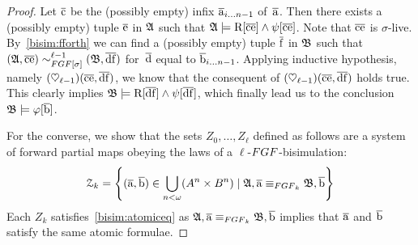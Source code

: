 \begin{proof}
  Let $\overline{\mathrm{c}}$ be the (possibly empty) infix $\overline{\mathrm{a}}_{i\ldots n{-}1}$ of~$\overline{\mathrm{a}}$.
  Then there exists a (possibly empty) tuple $\overline{\mathrm{e}}$ in ${\mathfrak{A}}$ such that ${\mathfrak{A}} \models \mathrm{R}[\overline{\mathrm{c}}\overline{\mathrm{e}}] \land \psi[\overline{\mathrm{c}}\overline{\mathrm{e}}]$.
  Note that $\overline{\mathrm{c}}\overline{\mathrm{e}}$ is $\sigma$-live. 
  By~\ref{bisim:fforth} we can find a (possibly empty) tuple $\overline{\mathrm{f}}$ in ${\mathfrak{B}}$ such that $(\str{A}, \elemtuplec\elemtuplee) \bisimto_{\FGF[\sigma]}^{\ell{-}1} (\str{B}, \elemtupled\elemtuplef)$ for~$\overline{\mathrm{d}}$ equal to $\overline{\mathrm{b}}_{i\ldots n{-}1}$.
  Applying inductive hypothesis, namely $(\heartsuit_{\ell{-}1})(\overline{\mathrm{c}}\overline{\mathrm{e}},\overline{\mathrm{d}}\overline{\mathrm{f}})$, we know that the consequent of $(\heartsuit_{\ell{-}1})(\overline{\mathrm{c}}\overline{\mathrm{e}},\overline{\mathrm{d}}\overline{\mathrm{f}})$ holds true.
  This clearly implies ${\mathfrak{B}} \models \mathrm{R}[\overline{\mathrm{d}}\overline{\mathrm{f}}] \land \psi[\overline{\mathrm{d}}\overline{\mathrm{f}}]$, which finally lead us to the conclusion ${\mathfrak{B}} \models \varphi[\overline{\mathrm{b}}]$.

  For the converse, we show that the sets $Z_{0}, \ldots, Z_{\ell}$ defined as follows are a system of forward partial maps obeying the laws of a $\ell$-$\FGF$-bisimulation:
  \begin{equation*}
  \mathcal{Z}_{k} = \left\{ (\elemtuplea, \elemtupleb) \in \bigcup_{n < \omega} (A^{n} \times B^{n}) \mid \str{A}, \elemtuplea \equiv_{\FGF_{k}} \str{B},\elemtupleb \right\}
  \end{equation*}
  Each $Z_{k}$ satisfies~\ref{bisim:atomiceq} as $\str{A}, \elemtuplea \equiv_{\FGF_{k}} \str{B},\elemtupleb$ implies that $\overline{\mathrm{a}}$ and $\overline{\mathrm{b}}$ satisfy the same atomic formulae.


\end{proof}
